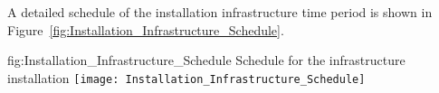 A detailed schedule of the installation infrastructure time period is shown in Figure~\ref{fig:Installation_Infrastructure_Schedule}.
    
\begin{dunefigure}
{fig:Installation_Infrastructure_Schedule}
    {Schedule for the infrastructure installation}
\texttt{[image: Installation\_Infrastructure\_Schedule]} 
\end{dunefigure}


\clearpage
